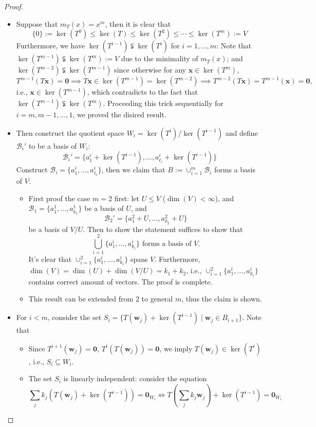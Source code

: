 \begin{proof}
\begin{itemize}
\item
Suppose that $m_T(x) = x^m$, then it is clear that
\[
\{0\}:=\ker(T^0)\le \ker(T)\le\ker(T^2)\le\cdots\le\ker(T^m):=V
\]
Furthermore, we have $\ker(T^{i-1})\subsetneqq\ker(T^i)$ for $i=1,\dots,m$:
Note that $\ker(T^{m-1})\subsetneqq\ker(T^m):=V$ due to the minimality of $m_T(x)$;
and $\ker(T^{m-2})\subsetneqq\ker(T^{m-1})$ since otherwise for any $\bm x\in\ker(T^m)$, 
\[
T^{m-1}(T\bm x)=\bm0\implies
T\bm x\in\ker(T^{m-1})=\ker(T^{m-2})
\implies
T^{m-2}(T\bm x)=T^{m-1}(\bm x)=\bm0,
\]
i.e., $\bm x\in\ker(T^{m-1})$, which contradicts to the fact that $\ker(T^{m-1})\subsetneqq\ker(T^m)$.
Proceeding this trick sequentially for $i=m,m-1,\dots,1$, we proved the disired result.
\item
Then construct the quotient space $W_i = \ker(T^i)/\ker(T^{i-1})$ and define $\mathcal{B}_i'$ to be a basis of $W_i$:
\[
\mathcal{B}_i' = \{a_1^i+\ker(T^{i-1}),\dots,a_{\ell_i}^i+\ker(T^{i-1})\}
\]
Construct $\mathcal{B}_i = \{a_1^i,\dots,a_{\ell_i}^i\}$, then we claim that $B := \cup_{i=1}^m\mathcal{B}_i$ forms a basis of $V$:
\begin{itemize}
\item
First proof the case $m=2$ first: let $U\le V$ ($\dim(V)<\infty$), and $\mathcal{B}_1=\{a_1^1,\dots,a_{k_1}^1\}$ be a basis of $U$, and
\[
\mathcal{B}_2'=\{a_1^2+U,\dots,a_{k_2}^2+U\}
\]
be a basis of $V/U$.
Then to show the statement suffices to show that 
\[
\bigcup_{i=1}^2\{a_1^i,\dots,a_{k_i}^i\}\text{ forms a basis of }V.
\]
It's clear that $\cup_{i=1}^2\{a_1^i,\dots,a_{k_i}^i\}$ spans $V$.
Furthermore, $\dim(V)=\dim(U)+\dim(V/U)=k_1+k_2$, i.e.,  $\cup_{i=1}^2\{a_1^i,\dots,a_{k_i}^i\}$ contains correct amount of vectors.
The proof is complete.
\item
This result can be extended from $2$ to general $m$, thus the claim is shown.
\end{itemize}
\item
For $i<m$, consider the set $S_i=\{T(\bm w_j)+\ker(T^{i-1})\mid \bm w_j\in B_{i+1}\}$. Note that 
\begin{itemize}
\item
Since $T^{i+1}(\bm w_j)=\bm0$, $T^i(T(\bm w_j))=\bm0$, we imply $T(\bm w_j)\in\ker(T^i)$, i.e., $S_i\subseteq W_i$.
\item
The set $S_i$ is linearly independent:
consider the equation
\[
\sum_jk_j(T(\bm w_j)+\ker(T^{i-1}))=\bm0_{W_i}
\Longleftrightarrow
T\left(\sum_jk_j\bm w_j\right)+\ker(T^{i-1})=\bm0_{W_i}
\]
\end{itemize}
\end{itemize}
\end{proof}
